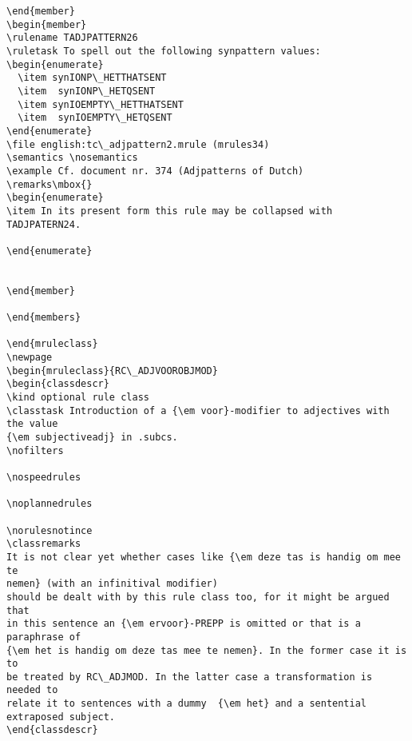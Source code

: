 \begin{verbatim}
\end{member}
\begin{member}
\rulename TADJPATTERN26
\ruletask To spell out the following synpattern values:
\begin{enumerate}
  \item synIONP\_HETTHATSENT
  \item  synIONP\_HETQSENT
  \item synIOEMPTY\_HETTHATSENT
  \item  synIOEMPTY\_HETQSENT
\end{enumerate}
\file english:tc\_adjpattern2.mrule (mrules34)
\semantics \nosemantics
\example Cf. document nr. 374 (Adjpatterns of Dutch)
\remarks\mbox{} 
\begin{enumerate}
\item In its present form this rule may be collapsed with TADJPATERN24.

\end{enumerate}


\end{member}

\end{members}

\end{mruleclass}
\newpage
\begin{mruleclass}{RC\_ADJVOOROBJMOD}
\begin{classdescr}
\kind optional rule class
\classtask Introduction of a {\em voor}-modifier to adjectives with the value 
{\em subjectiveadj} in .subcs. 
\nofilters

\nospeedrules

\noplannedrules

\norulesnotince
\classremarks
It is not clear yet whether cases like {\em deze tas is handig om mee te 
nemen} (with an infinitival modifier) 
should be dealt with by this rule class too, for it might be argued that
in this sentence an {\em ervoor}-PREPP is omitted or that is a paraphrase of 
{\em het is handig om deze tas mee te nemen}. In the former case it is to 
be treated by RC\_ADJMOD. In the latter case a transformation is needed to 
relate it to sentences with a dummy  {\em het} and a sentential 
extraposed subject.
\end{classdescr}


\end{verbatim}
